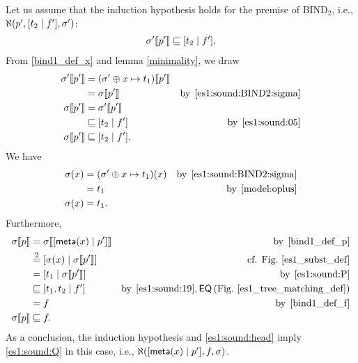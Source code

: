 \begin{enumerate}
\begin{enumerate}
    \end{enumerate}
    Let us assume that the induction hypothesis holds for the
    premise of \textsf{BIND}\(_2\), i.e.,
    \(\ind{U}(p', \cons{t_2}{f'}, \sigma')\):
    \begin{gather}
      \subst{p'}{\sigma'} \sqsubseteq \cons{t_2}{f'}. \label{es1:sound:05}
    \end{gather}
    From \ref{bind1_def_x} and lemma \ref{minimality}, we draw
    \begin{align}
         \subst{p'}{\sigma'}
      &= \subst{p'}{(\sigma' \oplus x \mapsto t_1)}\notag\\
      &= \subst{p'}{\sigma}
      &\text{by} \,\;
         \text{\ref{es1:sound:BIND2:sigma}}\notag\\
         \subst{p'}{\sigma}
      &= \subst{p'}{\sigma'}\notag\\
      &\sqsubseteq \cons{t_2}{f'}
      &\text{by} \,\; \eqref{es1:sound:05}\notag\\
         \subst{p'}{\sigma}
      &\sqsubseteq \cons{t_2}{f'}. \label{es1:sound:19}
    \end{align}
    We have
    \begin{align}
          \sigma(x) 
      &= (\sigma' \oplus x \mapsto t_1)(x)
      &\text{by} \,\;
       \text{\ref{es1:sound:BIND2:sigma}}\notag\\
      &= t_1
      &\text{by} \,\; \eqref{model:oplus}\notag\\
         \sigma(x) 
      &= t_1. \label{es1:sound:P}
    \end{align}
    Furthermore,
    \begin{align}
         \subst{p}{\sigma} 
      &= \subst{\cons{\meta{x}}{p'}}{\sigma}
      &\text{by} \,\; \text{\ref{bind1_def_p}}\notag\\
      &\eqn{2} \cons{\sigma(x)}{\subst{p'}{\sigma}}
      &\text{cf. Fig.~\ref{es1_subst_def}}\notag\\
      &= \cons{t_1}{\subst{p'}{\sigma}}
      &\text{by} \,\; \eqref{es1:sound:P}\notag\\
      &\sqsubseteq \cons{t_1, t_2}{f'}
      &\text{by} \,\; \eqref{es1:sound:19}, \textsf{EQ}
       \, (\text{Fig.~\ref{es1_tree_matching_def}})\notag\\
      &=f 
      &\text{by} \,\; \text{\ref{bind1_def_f}}\notag\\
         \subst{p}{\sigma}
      &\sqsubseteq f. \label{es1:sound:Q}
    \end{align}
    As a conclusion, the induction hypothesis and
    \eqref{es1:sound:head} imply \eqref{es1:sound:Q} in this case,
    i.e., \(\ind{U}(\cons{\meta{x}}{p'}, f, \sigma)\).


\end{enumerate}
